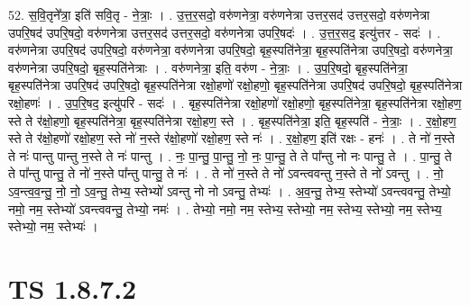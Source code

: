\documentclass[17pt]{extarticle}
\begin{document}
52. स॒वि॒तृने᳚त्रा॒ इति॑ सवि॒तृ - ने॒त्राः॒ । . उ॒त्त॒र॒सदो॒ वरु॑णनेत्रा॒ वरु॑णनेत्रा उत्तर॒सद॑ उत्तर॒सदो॒ वरु॑णनेत्रा उपरि॒षद॑ उपरि॒षदो॒ वरु॑णनेत्रा उत्तर॒सद॑ उत्तर॒सदो॒ वरु॑णनेत्रा उपरि॒षदः॑ । . उ॒त्त॒र॒सद॒ इत्यु॑त्तर - सदः॑ । . वरु॑णनेत्रा उपरि॒षद॑ उपरि॒षदो॒ वरु॑णनेत्रा॒ वरु॑णनेत्रा उपरि॒षदो॒ बृह॒स्पति॑नेत्रा॒ बृह॒स्पति॑नेत्रा उपरि॒षदो॒ वरु॑णनेत्रा॒ वरु॑णनेत्रा उपरि॒षदो॒ बृह॒स्पति॑नेत्राः । . वरु॑णनेत्रा॒ इति॒ वरु॑ण - ने॒त्राः॒ । . उ॒प॒रि॒षदो॒ बृह॒स्पति॑नेत्रा॒ बृह॒स्पति॑नेत्रा उपरि॒षद॑ उपरि॒षदो॒ बृह॒स्पति॑नेत्रा रक्षो॒हणो॑ रक्षो॒हणो॒ बृह॒स्पति॑नेत्रा उपरि॒षद॑ उपरि॒षदो॒ बृह॒स्पति॑नेत्रा रक्षो॒हणः॑ । . उ॒प॒रि॒षद॒ इत्यु॑परि - सदः॑ । . बृह॒स्पति॑नेत्रा रक्षो॒हणो॑ रक्षो॒हणो॒ बृह॒स्पति॑नेत्रा॒ बृह॒स्पति॑नेत्रा रक्षो॒हण॒ स्ते ते र॑क्षो॒हणो॒ बृह॒स्पति॑नेत्रा॒ बृह॒स्पति॑नेत्रा रक्षो॒हण॒ स्ते । . बृह॒स्पति॑नेत्रा॒ इति॒ बृह॒स्पति॑ - ने॒त्राः॒ । . र॒क्षो॒हण॒ स्ते ते र॑क्षो॒हणो॑ रक्षो॒हण॒ स्ते नो॑ न॒स्ते र॑क्षो॒हणो॑ रक्षो॒हण॒ स्ते नः॑ । . र॒क्षो॒हण॒ इति॑ रक्षः - हनः॑ । . ते नो॑ न॒स्ते ते नः॑ पान्तु पान्तु न॒स्ते ते नः॑ पान्तु । . नः॒ पा॒न्तु॒ पा॒न्तु॒ नो॒ नः॒ पा॒न्तु॒ ते ते पा᳚न्तु नो नः पान्तु॒ ते । . पा॒न्तु॒ ते ते पा᳚न्तु पान्तु॒ ते नो॑ न॒स्ते पा᳚न्तु पान्तु॒ ते नः॑ । . ते नो॑ न॒स्ते ते नो॑ ऽवन्त्ववन्तु न॒स्ते ते नो॑ ऽवन्तु । . नो॒ ऽव॒न्त्व॒व॒न्तु॒ नो॒ नो॒ ऽव॒न्तु॒ तेभ्य॒ स्तेभ्यो॑ ऽवन्तु नो नो ऽवन्तु॒ तेभ्यः॑ । . अ॒व॒न्तु॒ तेभ्य॒ स्तेभ्यो॑ ऽवन्त्ववन्तु॒ तेभ्यो॒ नमो॒ नम॒ स्तेभ्यो॑ ऽवन्त्ववन्तु॒ तेभ्यो॒ नमः॑ । . तेभ्यो॒ नमो॒ नम॒ स्तेभ्य॒ स्तेभ्यो॒ नम॒ स्तेभ्य॒ स्तेभ्यो॒ नम॒ स्तेभ्य॒ स्तेभ्यो॒ नम॒ स्तेभ्यः॑ । \newline
\pagebreak
{}
\section*{ TS 1.8.7.2 }
\end{document}
